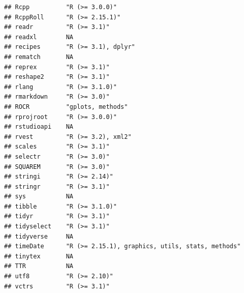 \documentclass[]{article}
\begin{document}
\begin{verbatim}
## Rcpp          "R (>= 3.0.0)"                                                           
## RcppRoll      "R (>= 2.15.1)"                                                          
## readr         "R (>= 3.1)"                                                             
## readxl        NA                                                                       
## recipes       "R (>= 3.1), dplyr"                                                      
## rematch       NA                                                                       
## reprex        "R (>= 3.1)"                                                             
## reshape2      "R (>= 3.1)"                                                             
## rlang         "R (>= 3.1.0)"                                                           
## rmarkdown     "R (>= 3.0)"                                                             
## ROCR          "gplots, methods"                                                        
## rprojroot     "R (>= 3.0.0)"                                                           
## rstudioapi    NA                                                                       
## rvest         "R (>= 3.2), xml2"                                                       
## scales        "R (>= 3.1)"                                                             
## selectr       "R (>= 3.0)"                                                             
## SQUAREM       "R (>= 3.0)"                                                             
## stringi       "R (>= 2.14)"                                                            
## stringr       "R (>= 3.1)"                                                             
## sys           NA                                                                       
## tibble        "R (>= 3.1.0)"                                                           
## tidyr         "R (>= 3.1)"                                                             
## tidyselect    "R (>= 3.1)"                                                             
## tidyverse     NA                                                                       
## timeDate      "R (>= 2.15.1), graphics, utils, stats, methods"                         
## tinytex       NA                                                                       
## TTR           NA                                                                       
## utf8          "R (>= 2.10)"                                                            
## vctrs         "R (>= 3.1)"                                                             

\end{verbatim}
\end{document}
